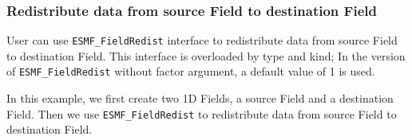  
\setlength{\oldparskip}{\parskip}
\setlength{\parskip}{1.5ex}
\setlength{\oldparindent}{\parindent}
\setlength{\parindent}{0pt}
\setlength{\oldbaselineskip}{\baselineskip}
\setlength{\baselineskip}{11pt}
 
\def\bv{\begin{verbatim}}
\def\ev{\end{verbatim}}
\def\be{\begin{equation}}
\def\ee{\end{equation}}
\def\bea{\begin{eqnarray}}
\def\eea{\end{eqnarray}}
\def\bi{\begin{itemize}}
\def\ei{\end{itemize}}
\def\bn{\begin{enumerate}}
\def\en{\end{enumerate}}
\def\bd{\begin{description}}
\def\ed{\end{description}}
\def\({\left (}
\def\){\right )}
\def\[{\left [}
\def\]{\right ]}
\def\<{\left  \langle}
\def\>{\right \rangle}
\def\cI{{\cal I}}
\def\diag{\mathop{\rm diag}}
\def\tr{\mathop{\rm tr}}


 

   \subsubsection{Redistribute data from source Field to destination Field}
   \label{sec:field:usage:redist_1dptr}
  
   User can use {\tt ESMF\_FieldRedist} interface to redistribute data from 
   source Field to destination Field. This interface is overloaded by type and kind;
   In the version of {\tt ESMF\_FieldRedist} without factor argument, a default value
   of 1 is used.
   
   \begin{sloppypar}
   In this example, we first create two 1D Fields, a source Field and a destination
   Field. Then we use {\tt ESMF\_FieldRedist} to
   redistribute data from source Field to destination Field.
   \end{sloppypar} 

